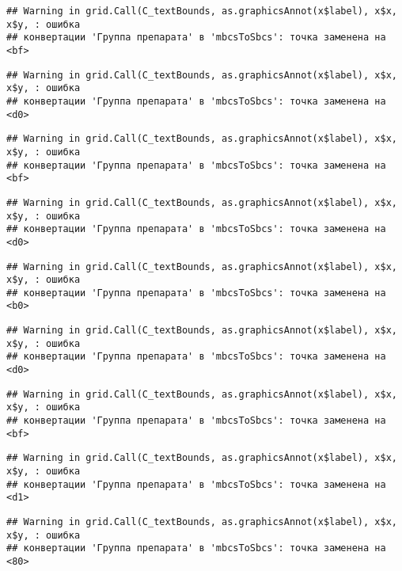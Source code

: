 \documentclass[
]{article}
\begin{document}
\begin{verbatim}
## Warning in grid.Call(C_textBounds, as.graphicsAnnot(x$label), x$x, x$y, : ошибка
## конвертации 'Группа препарата' в 'mbcsToSbcs': точка заменена на <bf>
\end{verbatim}

\begin{verbatim}
## Warning in grid.Call(C_textBounds, as.graphicsAnnot(x$label), x$x, x$y, : ошибка
## конвертации 'Группа препарата' в 'mbcsToSbcs': точка заменена на <d0>
\end{verbatim}

\begin{verbatim}
## Warning in grid.Call(C_textBounds, as.graphicsAnnot(x$label), x$x, x$y, : ошибка
## конвертации 'Группа препарата' в 'mbcsToSbcs': точка заменена на <bf>
\end{verbatim}

\begin{verbatim}
## Warning in grid.Call(C_textBounds, as.graphicsAnnot(x$label), x$x, x$y, : ошибка
## конвертации 'Группа препарата' в 'mbcsToSbcs': точка заменена на <d0>
\end{verbatim}

\begin{verbatim}
## Warning in grid.Call(C_textBounds, as.graphicsAnnot(x$label), x$x, x$y, : ошибка
## конвертации 'Группа препарата' в 'mbcsToSbcs': точка заменена на <b0>
\end{verbatim}

\begin{verbatim}
## Warning in grid.Call(C_textBounds, as.graphicsAnnot(x$label), x$x, x$y, : ошибка
## конвертации 'Группа препарата' в 'mbcsToSbcs': точка заменена на <d0>
\end{verbatim}

\begin{verbatim}
## Warning in grid.Call(C_textBounds, as.graphicsAnnot(x$label), x$x, x$y, : ошибка
## конвертации 'Группа препарата' в 'mbcsToSbcs': точка заменена на <bf>
\end{verbatim}

\begin{verbatim}
## Warning in grid.Call(C_textBounds, as.graphicsAnnot(x$label), x$x, x$y, : ошибка
## конвертации 'Группа препарата' в 'mbcsToSbcs': точка заменена на <d1>
\end{verbatim}

\begin{verbatim}
## Warning in grid.Call(C_textBounds, as.graphicsAnnot(x$label), x$x, x$y, : ошибка
## конвертации 'Группа препарата' в 'mbcsToSbcs': точка заменена на <80>
\end{verbatim}
\end{document}
